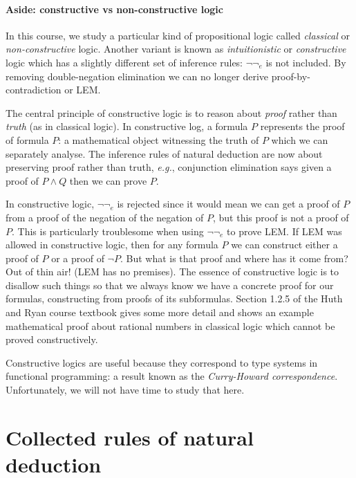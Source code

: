 \documentclass{article}
\theoremstyle{definition}
\newcommand{\eg}{\emph{e.g.}}
\begin{document}
\paragraph{Aside: constructive vs non-constructive logic}

In this course, we study a particular kind of propositional logic
called \emph{classical} or \emph{non-constructive}
logic. Another variant is known as \emph{intuitionistic} or
\emph{constructive} logic which has a slightly different
set of inference rules: $\neg\neg_e$ is not included. By removing
double-negation elimination we can no longer derive
proof-by-contradiction or LEM.

The central principle of constructive logic is to reason about
\emph{proof} rather than \emph{truth} (as in classical logic). In
constructive log, a
formula $P$ represents the proof of formula $P$: a mathematical object
witnessing the truth of $P$ which we can separately analyse. The
inference rules of natural deduction are now about preserving proof
rather than truth, \eg{}, conjunction elimination says given a proof
of $P \wedge Q$ then we can prove $P$.

In constructive logic, $\neg\neg_e$ is rejected since it would mean we
can get a proof of $P$ from a proof of the negation of the negation of
$P$, but this proof is not a proof of $P$. This is particularly
troublesome when using $\neg\neg_e$ to prove LEM. If LEM was allowed
in constructive logic, then for any formula $P$ we can construct
either a proof of $P$ or a proof of $\neg P$. But what is that proof
and where has it come from? Out of thin air! (LEM has no
premises). The essence of constructive logic is to disallow such
things so that we always know we have a concrete proof for our
formulas, constructing from proofs of its subformulas. Section 1.2.5
of the Huth and Ryan course textbook gives some more detail and shows
an example mathematical proof about rational numbers in classical logic
which cannot be proved constructively.

Constructive logics are useful because they correspond to type systems
in functional programming: a result known as the \emph{Curry-Howard
  correspondence}. Unfortunately, we will not have time to study that here.

\newpage

\section{Collected rules of natural deduction}
\end{document}
